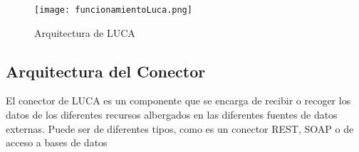\begin{figure}[!tb]
	\centering
	\texttt{[image: funcionamientoLuca.png]}
	\caption{Arquitectura de LUCA}
    \label{fig:funcionamientoLuca}
\end{figure}





\subsection{Arquitectura del Conector}


El conector de LUCA es un componente que se encarga de recibir o recoger los datos de los diferentes recursos albergados en las diferentes fuentes de datos externas. Puede ser de diferentes tipos, como es un conector REST, SOAP o de acceso a bases de datos

